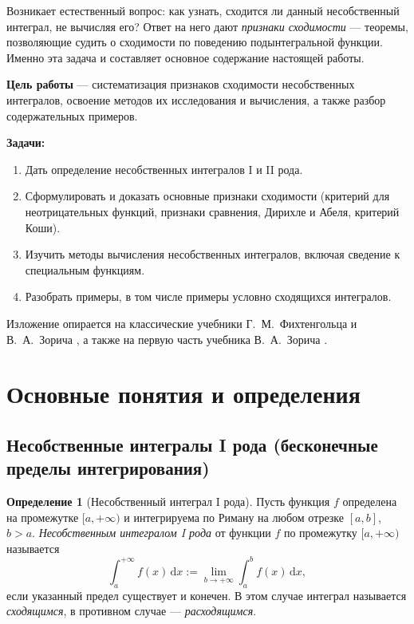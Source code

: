 \documentclass[12pt,a4paper]{article}
\theoremstyle{definition}
\newtheorem{definition}{Определение}[section]
\newcommand{\dd}{\,\mathrm{d}}
\begin{document}
Возникает естественный вопрос: как узнать, сходится ли данный несобственный интеграл, не вычисляя его? Ответ на него дают \emph{признаки сходимости} — теоремы, позволяющие судить о сходимости по поведению подынтегральной функции. Именно эта задача и составляет основное содержание настоящей работы.

\textbf{Цель работы} — систематизация признаков сходимости несобственных интегралов, освоение методов их исследования и вычисления, а также разбор содержательных примеров.

\textbf{Задачи:}
\begin{enumerate}[label=\arabic*.]
\item Дать определение несобственных интегралов I и II рода.
\item Сформулировать и доказать основные признаки сходимости (критерий для неотрицательных функций, признаки сравнения, Дирихле и Абеля, критерий Коши).
\item Изучить методы вычисления несобственных интегралов, включая сведение к специальным функциям.
\item Разобрать примеры, в том числе примеры условно сходящихся интегралов.
\end{enumerate}

Изложение опирается на классические учебники Г.~М.~Фихтенгольца \cite{Ficht} и В.~А.~Зорича \cite{Zorich2}, а также на первую часть учебника В.~А.~Зорича \cite{Zorich1}.

\section{Основные понятия и определения}

\subsection{Несобственные интегралы I рода (бесконечные пределы интегрирования)}

\begin{definition}[Несобственный интеграл I рода]
Пусть функция $f$ определена на промежутке $[a,+\infty)$ и интегрируема по Риману на любом отрезке $[a,b]$, $b>a$. \emph{Несобственным интегралом I рода} от функции $f$ по промежутку $[a,+\infty)$ называется
\begin{equation}\label{eq:Irod}
\int_a^{+\infty} f(x)\dd x := \lim_{b\to+\infty}\int_a^b f(x)\dd x,
\end{equation}
если указанный предел существует и конечен. В этом случае интеграл называется \emph{сходящимся}, в противном случае — \emph{расходящимся}.
\end{definition}
\end{document}

